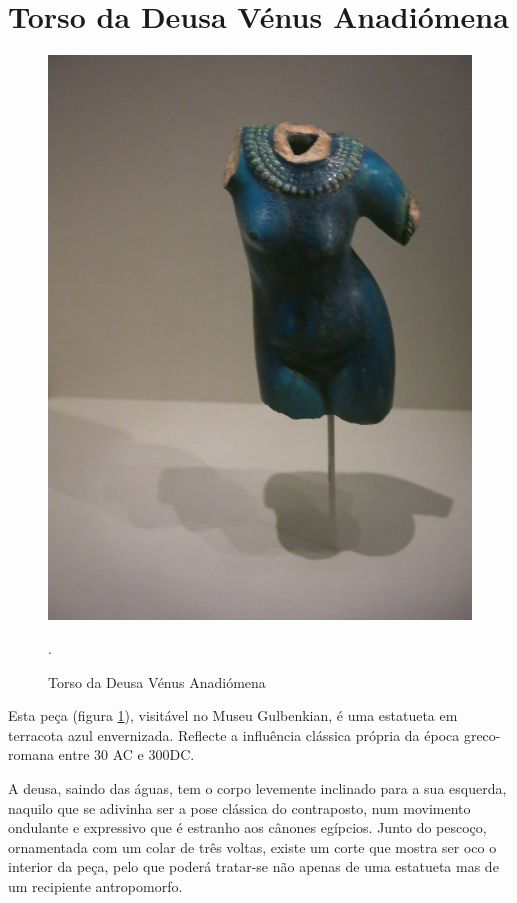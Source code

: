 \documentclass{article}
\begin{document}
\section{Torso da Deusa Vénus Anadiómena}

\begin{figure}
\centering\includegraphics[height=0.3\textheight,keepaspectratio]
                          {venus.jpg}
  \caption{Torso da Deusa Vénus Anadiómena}.
  \label{fig:2}
\end{figure}

Esta peça (figura \ref{fig:2}), visitável no Museu Gulbenkian, é uma
estatueta em terracota azul envernizada. Reflecte a influência
clássica própria da época greco-romana entre 30 AC e 300DC.

A deusa, saindo das águas, tem o corpo levemente inclinado para a sua
esquerda, naquilo que se adivinha ser a pose clássica do contraposto,
num movimento ondulante e expressivo que é estranho aos cânones
egípcios. Junto do pescoço, ornamentada com um colar de três voltas,
existe um corte que mostra ser oco o interior da peça, pelo que poderá
tratar-se não apenas de uma estatueta mas de um recipiente
antropomorfo.
\end{document}
